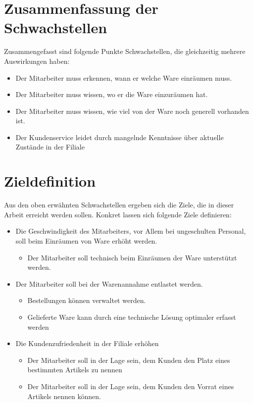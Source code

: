 \section{Zusammenfassung der Schwachstellen}
Zusammengefasst sind folgende Punkte Schwachstellen, die gleichzeitig mehrere Auswirkungen haben:
\begin{itemize}
	\item Der Mitarbeiter muss erkennen, wann er welche Ware einräumen muss.
	\item Der Mitarbeiter muss wissen, wo er die Ware einzuräumen hat.
	\item Der Mitarbeiter muss wissen, wie viel von der Ware noch generell vorhanden ist.
	\item Der Kundenservice leidet durch mangelnde Kenntnisse über aktuelle Zustände in der Filiale
\end{itemize}
\section{Zieldefinition}
\label{sec:zieldefinition}
Aus den oben erwähnten Schwachstellen ergeben sich die Ziele, die in dieser Arbeit erreicht werden sollen. Konkret lassen sich folgende Ziele definieren:
\begin{itemize}
	\item Die Geschwindigkeit des Mitarbeiters, vor Allem bei ungeschulten Personal, soll beim Einräumen von Ware erhöht werden.
	\begin{itemize}
		\item Der Mitarbeiter soll technisch beim Einräumen der Ware unterstützt werden.
	\end{itemize}
	\item Der Mitarbeiter soll bei der Warenannahme entlastet werden.
	\begin{itemize}
		\item Bestellungen können verwaltet werden.
		\item Gelieferte Ware kann durch eine technische Lösung optimaler erfasst werden
	\end{itemize}
	\item Die Kundenzufriedenheit in der Filiale erhöhen
	\begin{itemize}
		\item Der Mitarbeiter soll in der Lage sein, dem Kunden den Platz eines bestimmten Artikels zu nennen
		\item Der Mitarbeiter soll in der Lage sein, dem Kunden den Vorrat eines Artikels nennen können. 
	\end{itemize}
\end{itemize}
